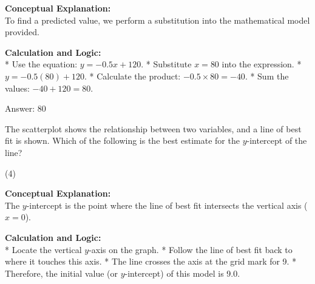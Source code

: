 \documentclass[11pt,paper=a4,answers]{exam}
\begin{document}
\begin{questions}
\begin{solution}
\textbf{Conceptual Explanation:} \\
To find a predicted value, we perform a substitution into the mathematical model provided.

\vspace{30pt}

\textbf{Calculation and Logic:} \\
* Use the equation: $y = -0.5x + 120$.
* Substitute $x = 80$ into the expression.
* $y = -0.5(80) + 120$.
* Calculate the product: $-0.5 \times 80 = -40$.
* Sum the values: $-40 + 120 = 80$.

\vspace{30pt}

Answer: \colorbox{yellow!100}{80}
\end{solution}

\vspace{60pt}

\question
\begin{center}
\end{center}
The scatterplot shows the relationship between two variables, and a line of best fit is shown. Which of the following is the best estimate for the $y$-intercept of the line?
\begin{tasks}(4)
\end{tasks}

\begin{solution}
\textbf{Conceptual Explanation:} \\
The $y$-intercept is the point where the line of best fit intersects the vertical axis ($x = 0$).

\vspace{30pt}

\textbf{Calculation and Logic:} \\
* Locate the vertical $y$-axis on the graph.
* Follow the line of best fit back to where it touches this axis.
* The line crosses the axis at the grid mark for 9.
* Therefore, the initial value (or $y$-intercept) of this model is 9.0.


\end{solution}
\end{questions}
\end{document}
